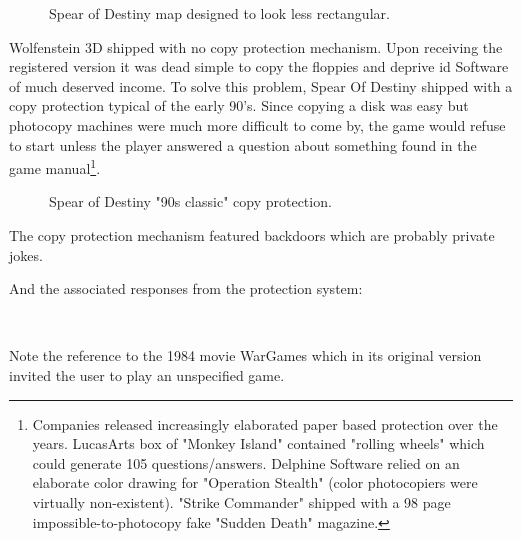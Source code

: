 \documentclass[book.tex]{subfiles}
\begin{document}
   \par
\begin{figure}[H]
\centering
 \caption{Spear of Destiny map designed to look less rectangular.}
 \end{figure}
 \par
\vspace{-10pt}
Wolfenstein 3D shipped with no copy protection mechanism. Upon receiving the registered version it was dead simple to copy the floppies and deprive id Software of much deserved income. To solve this problem, Spear Of Destiny shipped with a copy protection typical of the early 90's. Since copying a disk was easy but photocopy machines were much more difficult to come by, the game would refuse to start unless the player answered a question about something found in the game manual\footnote{Companies released increasingly elaborated paper based protection over the years. LucasArts box of "Monkey Island" contained "rolling wheels" which could generate 105 questions/answers. Delphine Software relied on an elaborate color drawing for "Operation Stealth" (color photocopiers were virtually non-existent). "Strike Commander" shipped with a 98 page impossible-to-photocopy fake "Sudden Death" magazine.}.
    
\begin{figure}[H]
\centering
 \caption{Spear of Destiny "90s classic" copy protection.}
 \end{figure}
 \par
 The copy protection mechanism featured backdoors which are probably private jokes.\\
\par
\begin{minipage}{\textwidth}

\end{minipage}
\par
And the associated responses from the protection system:


\begin{minipage}{\textwidth}

\end{minipage}\\
\par
Note the reference to the 1984 movie WarGames which in its original version invited the user to play an unspecified game.
    \par
\begin{figure}[H]
\centering
 \end{figure}
 \par
\end{document}

